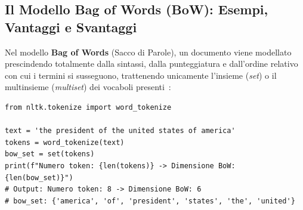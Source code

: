 \FloatBarrier
\subsection{Il Modello Bag of Words (BoW): Esempi, Vantaggi e Svantaggi}
\label{subsec:bag-of-words}

Nel modello \textbf{Bag of Words} (Sacco di Parole), un documento viene modellato prescindendo totalmente dalla sintassi, dalla punteggiatura e dall'ordine relativo con cui i termini si susseguono, trattenendo unicamente l'insieme (\textit{set}) o il multinsieme (\textit{multiset}) dei vocaboli presenti~\cite{manning2008}:

\begin{lstlisting}[style=pythoncode,caption={Costruzione del Bag of Words in Python.}]
from nltk.tokenize import word_tokenize

text = 'the president of the united states of america'
tokens = word_tokenize(text)
bow_set = set(tokens)
print(f"Numero token: {len(tokens)} -> Dimensione BoW: {len(bow_set)}")
# Output: Numero token: 8 -> Dimensione BoW: 6
# bow_set: {'america', 'of', 'president', 'states', 'the', 'united'}
\end{lstlisting}

